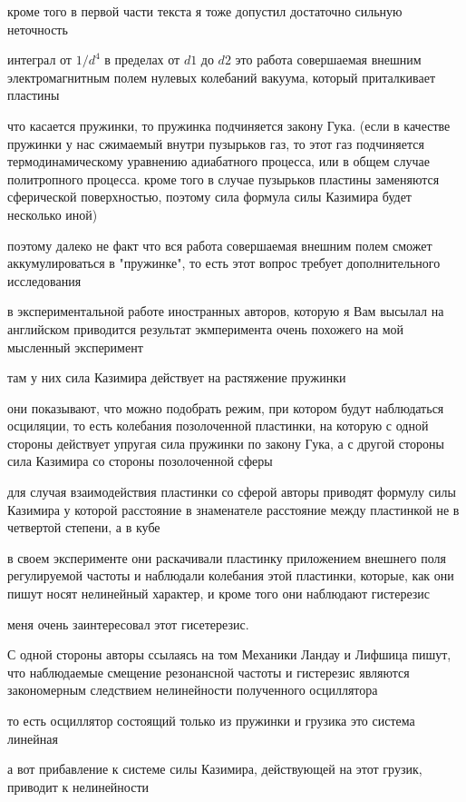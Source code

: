 \documentclass[12pt, letterpaper]{article}
\begin{document}
кроме того в первой части текста я тоже допустил достаточно сильную неточность

интеграл от $1/d^4$ в пределах от $d1$ до $d2$ это работа совершаемая внешним электромагнитным полем нулевых колебаний вакуума, который приталкивает пластины

что касается пружинки, то пружинка подчиняется закону Гука. (если в качестве пружинки у нас сжимаемый внутри пузырьков газ, то этот газ подчиняется термодинамическому уравнению адиабатного процесса, или в общем случае политропного процесса. кроме того в случае пузырьков пластины заменяются сферической поверхностью, поэтому сила формула силы Казимира будет несколько иной)

поэтому далеко не факт что вся работа совершаемая внешним полем сможет аккумулироваться в "пружинке", то есть этот вопрос требует дополнительного исследования

в экспериментальной работе иностранных авторов, которую я Вам высылал на английском приводится результат экмперимента очень похожего на мой мысленный эксперимент

там у них сила Казимира действует на растяжение пружинки

они показывают, что можно подобрать режим, при котором будут наблюдаться осциляции, то есть колебания позолоченной пластинки, на которую с одной стороны действует упругая сила пружинки по закону Гука, а с другой стороны сила Казимира со стороны позолоченной сферы

для случая взаимодействия пластинки со сферой авторы приводят формулу силы Казимира у которой расстояние в знаменателе расстояние между пластинкой не в четвертой степени, а в кубе


в своем эксперименте они раскачивали пластинку приложением внешнего поля регулируемой частоты и наблюдали колебания этой пластинки, которые, как они пишут носят нелинейный характер, и кроме того они наблюдают гистерезис

меня очень заинтересовал этот гисетерезис.

С одной стороны авторы ссылаясь на том Механики Ландау и Лифшица пишут, что наблюдаемые смещение резонансной частоты и гистерезис являются закономерным следствием нелинейности полученного осциллятора

то есть осциллятор состоящий только из пружинки и грузика это система линейная

а вот прибавление к системе силы Казимира, действующей на этот грузик, приводит к нелинейности
\end{document}

